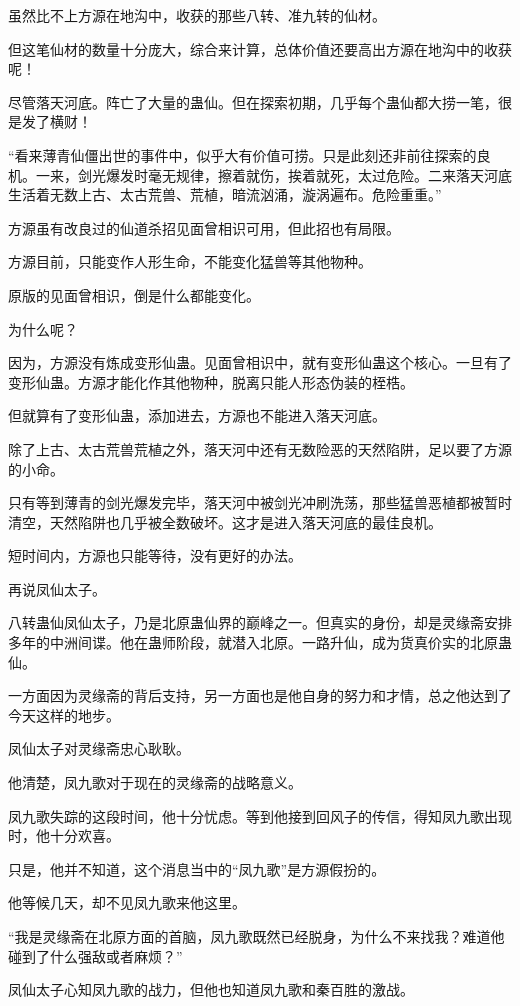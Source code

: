 \begin{this_body}
虽然比不上方源在地沟中，收获的那些八转、准九转的仙材。

但这笔仙材的数量十分庞大，综合来计算，总体价值还要高出方源在地沟中的收获呢！

尽管落天河底。阵亡了大量的蛊仙。但在探索初期，几乎每个蛊仙都大捞一笔，很是发了横财！

“看来薄青仙僵出世的事件中，似乎大有价值可捞。只是此刻还非前往探索的良机。一来，剑光爆发时毫无规律，擦着就伤，挨着就死，太过危险。二来落天河底生活着无数上古、太古荒兽、荒植，暗流汹涌，漩涡遍布。危险重重。”

方源虽有改良过的仙道杀招见面曾相识可用，但此招也有局限。

方源目前，只能变作人形生命，不能变化猛兽等其他物种。

原版的见面曾相识，倒是什么都能变化。

为什么呢？

因为，方源没有炼成变形仙蛊。见面曾相识中，就有变形仙蛊这个核心。一旦有了变形仙蛊。方源才能化作其他物种，脱离只能人形态伪装的桎梏。

但就算有了变形仙蛊，添加进去，方源也不能进入落天河底。

除了上古、太古荒兽荒植之外，落天河中还有无数险恶的天然陷阱，足以要了方源的小命。

只有等到薄青的剑光爆发完毕，落天河中被剑光冲刷洗荡，那些猛兽恶植都被暂时清空，天然陷阱也几乎被全数破坏。这才是进入落天河底的最佳良机。

短时间内，方源也只能等待，没有更好的办法。

再说凤仙太子。

八转蛊仙凤仙太子，乃是北原蛊仙界的巅峰之一。但真实的身份，却是灵缘斋安排多年的中洲间谍。他在蛊师阶段，就潜入北原。一路升仙，成为货真价实的北原蛊仙。

一方面因为灵缘斋的背后支持，另一方面也是他自身的努力和才情，总之他达到了今天这样的地步。

凤仙太子对灵缘斋忠心耿耿。

他清楚，凤九歌对于现在的灵缘斋的战略意义。

凤九歌失踪的这段时间，他十分忧虑。等到他接到回风子的传信，得知凤九歌出现时，他十分欢喜。

只是，他并不知道，这个消息当中的“凤九歌”是方源假扮的。

他等候几天，却不见凤九歌来他这里。

“我是灵缘斋在北原方面的首脑，凤九歌既然已经脱身，为什么不来找我？难道他碰到了什么强敌或者麻烦？”

凤仙太子心知凤九歌的战力，但他也知道凤九歌和秦百胜的激战。


\end{this_body}
